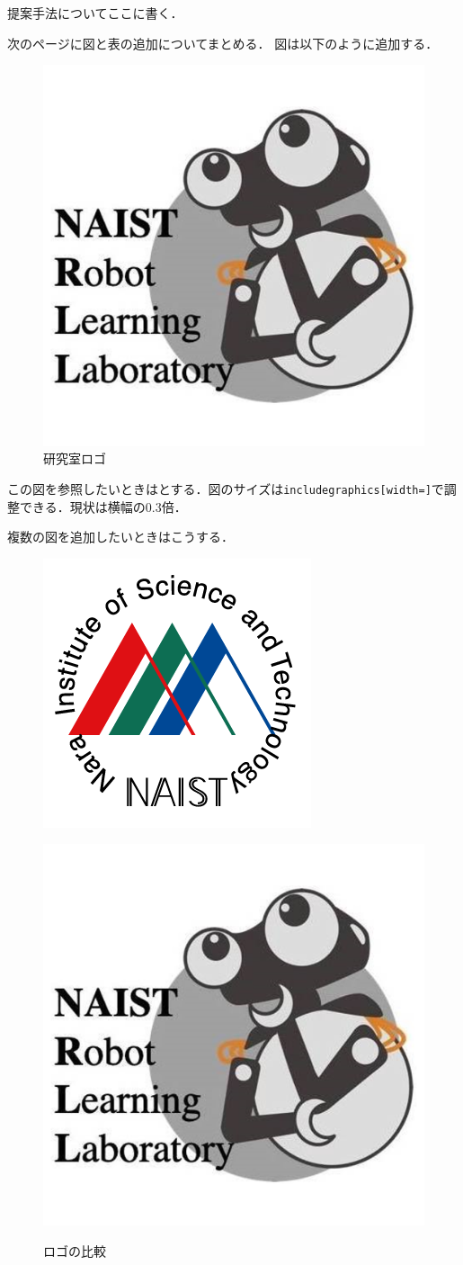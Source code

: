 提案手法についてここに書く．

\vspace{10truemm}
次のページに図と表の追加についてまとめる．
\newpage
図は以下のように追加する．
\begin{figure}[t]
    \centering
    \includegraphics[clip, width=0.3\linewidth]{figures/rll_logo.png}
    \caption{研究室ロゴ}
    \label{fig: our_logo}
\end{figure}

この図を参照したいときはとする．図のサイズは\texttt{includegraphics[width=]}で調整できる．現状は横幅の$0.3$倍．

複数の図を追加したいときはこうする．
\begin{figure}[t]
    \centering
  \begin{minipage}{0.49\linewidth}
    \centering
    \includegraphics[clip, trim=0 0 0 0, width=0.5\linewidth]{figures/logomark_Rnasi.png}
    \label{fig: naist_logo}
  \end{minipage}
  \begin{minipage}{0.49\linewidth}
    \centering
    \includegraphics[clip, trim=0 0 0 0, width=0.5\linewidth]{figures/rll_logo.png}
    \label{fig: rll_logo}
  \end{minipage}
  \caption{ロゴの比較}
  \label{fig: logo_comp}
\end{figure}

